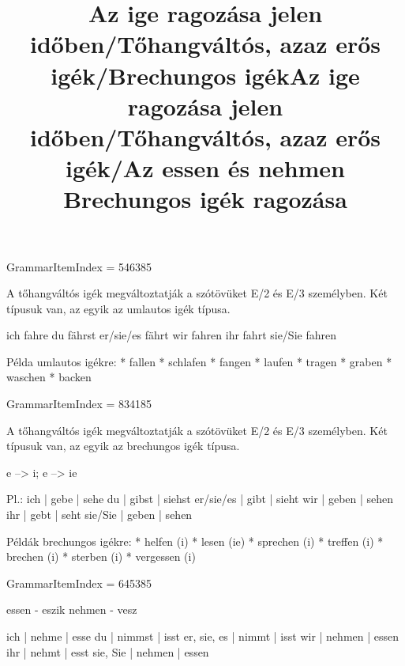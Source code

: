 GrammarItemIndex = 546385

\begin{desc}
A tőhangváltós igék megváltoztatják a szótövüket E/2 és E/3 személyben. Két típusuk van, az egyik az umlautos igék típusa.

ich fahre 
du fährst 
er/sie/es fährt 
wir fahren 
ihr fahrt 
sie/Sie fahren 

Példa umlautos igékre:
* fallen
* schlafen
* fangen
* laufen
* tragen
* graben
* waschen
* backen
\end{desc}

\begin{exmp}
\end{exmp}

\title{Az ige ragozása jelen időben/Tőhangváltós, azaz erős igék/Brechungos igék}

GrammarItemIndex = 834185

\begin{desc}
A tőhangváltós igék megváltoztatják a szótövüket E/2 és E/3 személyben. Két típusuk van, az egyik az brechungos igék típusa.

e --> i; e --> ie

Pl.:
ich       | gebe  | sehe 
du        | gibst | siehst
er/sie/es | gibt  | sieht 
wir       | geben | sehen 
ihr       | gebt  | seht 
sie/Sie   | geben | sehen 

Példák brechungos igékre:
* helfen (i)
* lesen (ie)
* sprechen (i)
* treffen (i)
* brechen (i)
* sterben (i)
* vergessen (i)
\end{desc}

\begin{exmp}
\end{exmp}

\title{Az ige ragozása jelen időben/Tőhangváltós, azaz erős igék/Az essen és nehmen Brechungos igék ragozása}

GrammarItemIndex = 645385

\begin{desc}
essen - eszik
nehmen - vesz

ich         | nehme  | esse 
du          | nimmst | isst 
er, sie, es | nimmt  | isst 
wir         | nehmen | essen 
ihr         | nehmt  | esst 
sie, Sie    | nehmen | essen 
\end{desc}

